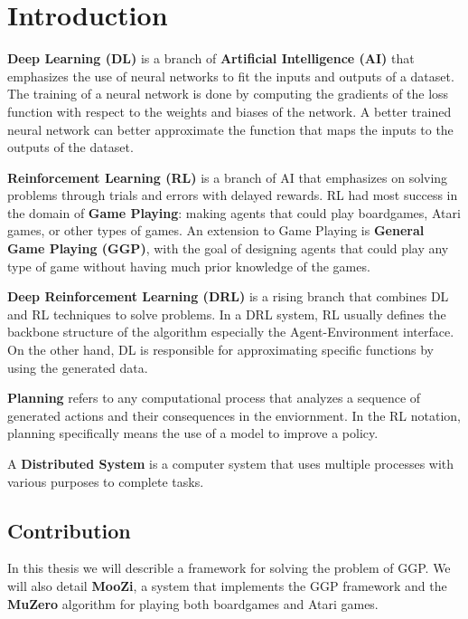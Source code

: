 \documentclass[12pt]{article}
\newcommand{\note}[1]{\todo[color=yellow!40,bordercolor=none,linecolor=black]{#1}}
\begin{document}
\listoftodos

\section{Introduction}

\note{8 - 10 pages of introduction}

\textbf{Deep Learning (DL)} is a branch of \textbf{Artificial Intelligence (AI)} that emphasizes the use of neural networks to fit the inputs and outputs of a dataset.
The training of a neural network is done by computing the gradients of the loss function with respect to the weights and biases of the network.
A better trained neural network can better approximate the function that maps the inputs to the outputs of the dataset.

\textbf{Reinforcement Learning (RL)} is a branch of AI that emphasizes on solving problems through trials and errors with delayed rewards.
RL had most success in the domain of \textbf{Game Playing}: making agents that could play boardgames, Atari games, or other types of games.
An extension to Game Playing is \textbf{General Game Playing (GGP)}, with the goal of designing agents that could play any type of game without having much prior knowledge of the games.

\textbf{Deep Reinforcement Learning (DRL)} is a rising branch that combines DL and RL techniques to solve problems.
In a DRL system, RL usually defines the backbone structure of the algorithm especially the Agent-Environment interface.
On the other hand, DL is responsible for approximating specific functions by using the generated data.

\textbf{Planning} refers to any computational process that analyzes a sequence of generated actions and their consequences in the enviornment.
In the RL notation, planning specifically means the use of a model to improve a policy.

A \textbf{Distributed System} is a computer system that uses multiple processes with various purposes to complete tasks.

\subsection{Contribution}
In this thesis we will describle a framework for solving the problem of GGP.
We will also detail \textbf{MooZi}, a system that implements the GGP framework and the \textbf{MuZero} algorithm for playing both boardgames and Atari games.
\end{document}

